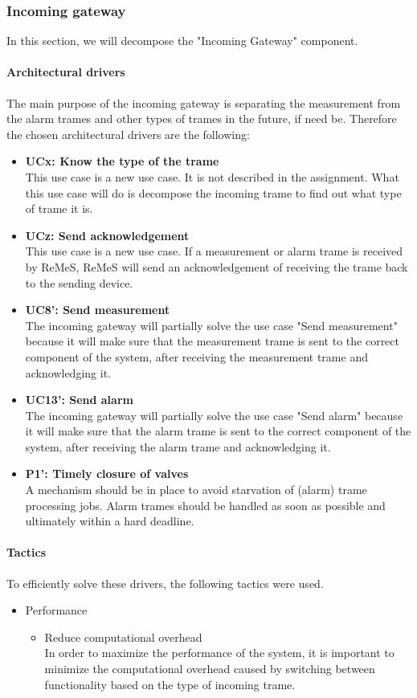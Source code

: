 \subsubsection{Incoming gateway}
In this section, we will decompose the "Incoming Gateway" component.
\paragraph{Architectural drivers}
The main purpose of the incoming gateway is separating the measurement from
the alarm trames and other types of trames in the future, if need be. Therefore the chosen architectural drivers are the following:
\begin{itemize}
	\item \textbf{UCx: Know the type of the trame}\\
	This use case is a new use case. It is not described in the assignment.
		What this use case will do is decompose the incoming trame to find
		out what type of trame it is. 
	\item \textbf{UCz: Send acknowledgement}\\
	This use case is a new use case. If a measurement or alarm trame is received
		by ReMeS, ReMeS will send an acknowledgement of receiving the trame back
		to the sending device.
		
	\item \textbf{UC8': Send measurement}\\
	The incoming gateway will partially solve the use case "Send measurement"
		because it will make sure that the measurement trame is sent to the
		correct component of the system, after receiving the measurement trame and acknowledging it.
	\item \textbf{UC13': Send alarm}\\
	The incoming gateway will partially solve the use case "Send alarm"
		because it will make sure that the alarm trame is sent to the
		correct component of the system, after receiving the alarm trame and acknowledging it.
	\item \textbf{P1': Timely closure of valves}\\
	A mechanism should be in place to avoid starvation of (alarm) trame processing jobs.
	Alarm trames should be handled as soon as possible and ultimately within a hard deadline.
\end{itemize}
\paragraph{Tactics}
To efficiently solve these drivers, the following tactics were used.
\begin{itemize}
	\item{Performance}
	\begin{itemize}
		\item{Reduce computational overhead} \\
		In order to maximize the performance of the system, it is important to minimize the computational overhead caused by switching between functionality based on the type of incoming trame.

	\end{itemize}
\end{itemize}
